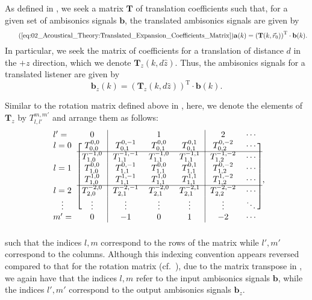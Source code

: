 As defined in , we seek a matrix $\mathbf{T}$ of translation coefficients such that, for a given set of ambisonics signals $\mathbf{b}$, the translated ambisonics signals are given by
\begin{equation}\tag{\ref{eq:02_Acoustical_Theory:Translated_Expansion_Coefficients_Matrix}}
\mathbf{a}(k) = \left( \mathbf{T}(k, \vec{r}_0) \right)^\text{T} \cdot \mathbf{b}(k).
\end{equation}
In particular, we seek the matrix of coefficients for a translation of distance $d$ in the $+z$ direction, which we denote $\mathbf{T}_z(k, d \hat{z})$.
Thus, the ambisonics signals for a translated listener are given by
\begin{equation}\label{eq:A1_Navigation_Filters:z_Translation}
\mathbf{b}_z(k) = \left( \mathbf{T}_z(k, d \hat{z}) \right)^\text{T} \cdot \mathbf{b}(k).
\end{equation}

Similar to the rotation matrix defined above in , here, we denote the elements of $\mathbf{T}_z$ by $T_{l,l'}^{m,m'}$ and arrange them as follows:
\begin{equation}
    \begin{blockarray}{lc|ccc|cc}
    l' = & 0 & & 1 & & 2 & \cdots \\
    \begin{block}{c[c|ccc|cc]}
    l = 0 & T_{0,0}^{0,0} & T_{0,1}^{0,-1} & T_{0,1}^{0,0} & T_{0,1}^{0,1} & T_{0,2}^{0,-2} & \cdots \\ \cline{2-7}
     & T_{1,0}^{-1,0} & T_{1,1}^{-1,-1} & T_{1,1}^{-1,0} & T_{1,1}^{-1,1} & T_{1,2}^{-1,-2} & \cdots \\
    l = 1 & T_{1,0}^{0,0} & T_{1,1}^{0,-1} & T_{1,1}^{0,0} & T_{1,1}^{0,1} & T_{1,2}^{0,-2} & \cdots \\
     & T_{1,0}^{1,0} & T_{1,1}^{1,-1} & T_{1,1}^{1,0} & T_{1,1}^{1,1} & T_{1,2}^{1,-2} & \cdots \\ \cline{2-7}
    l = 2 & T_{2,0}^{-2,0} & T_{2,1}^{-2,-1} & T_{2,1}^{-2,0} & T_{2,1}^{-2,1} & T_{2,2}^{-2,-2} & \cdots \\
    \vdots & \vdots & \vdots & \vdots & \vdots & \vdots & \ddots \\
    \end{block}
    m' = & 0 & -1 & 0 & 1 & -2 & \cdots \\
    \end{blockarray},
\end{equation}
such that the indices $l,m$ correspond to the rows of the matrix while $l',m'$ correspond to the columns.
Although this indexing convention appears reversed compared to that for the rotation matrix (cf.~), due to the matrix transpose in , we again have that the indices $l,m$ refer to the input ambisonics signals $\mathbf{b}$, while the indices $l',m'$ correspond to the output ambisonics signals $\mathbf{b}_z$.

